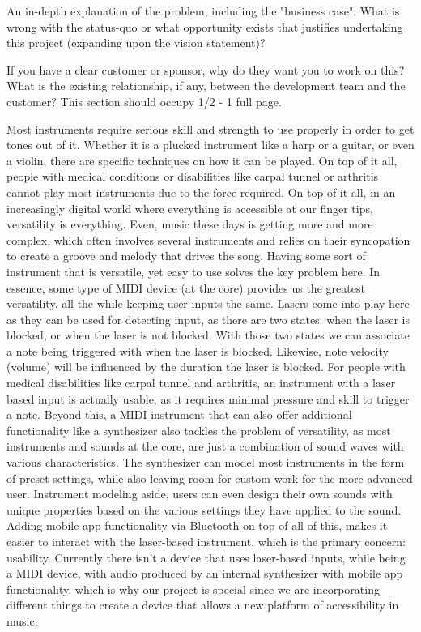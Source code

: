 An in-depth explanation of the problem, including the "business case". What is wrong with the status-quo or what opportunity exists that justifies undertaking this project (expanding upon the vision statement)?

If you have a clear customer or sponsor, why do they want you to work on this? What is the existing relationship, if any, between the development team and the customer? This section should occupy 1/2 - 1 full page.

Most instruments require serious skill and strength to use properly in order to get tones out of it. Whether it is a plucked instrument like a harp or a guitar, or even a violin, there are specific techniques on how it can be played. On top of it all, people with medical conditions or disabilities like carpal tunnel or arthritis cannot play most instruments due to the force required. On top of it all, in an increasingly digital world where everything is accessible at our finger tips, versatility is everything. Even, music these days is getting more and more complex,  which often involves several instruments and relies on their syncopation to create a groove and melody that drives the song. Having some sort of instrument that is versatile, yet easy to use solves the key problem here. In essence, some type of MIDI device (at the core) provides us the greatest versatility, all the while keeping user inputs the same. Lasers come into play here as they can be used for detecting input, as there are two states: when the laser is blocked, or when the laser is not blocked. With those two states we can associate a note being triggered with when the laser is blocked. Likewise, note velocity (volume) will be influenced by the duration the laser is blocked. For people with medical disabilities like carpal tunnel and arthritis, an instrument with a laser based input is actually usable, as it requires minimal pressure and skill to trigger a note. Beyond this, a MIDI instrument that can also offer additional functionality like a synthesizer also tackles the problem of versatility, as most instruments and sounds at the core, are just a combination of sound waves with various characteristics. The synthesizer can model most instruments in the form of preset settings, while also leaving room for custom work for the more advanced user. Instrument modeling aside, users can even design their own sounds with unique properties based on the various settings they have applied to the sound. Adding mobile app functionality via Bluetooth on top of all of this, makes it easier to interact with the laser-based instrument, which is the primary concern: usability. Currently there isn’t a device that uses laser-based inputs, while being a MIDI device, with audio produced by an internal synthesizer with mobile app functionality, which is why our project is special since we are incorporating different things to create a device that allows a new platform of accessibility in music.  
